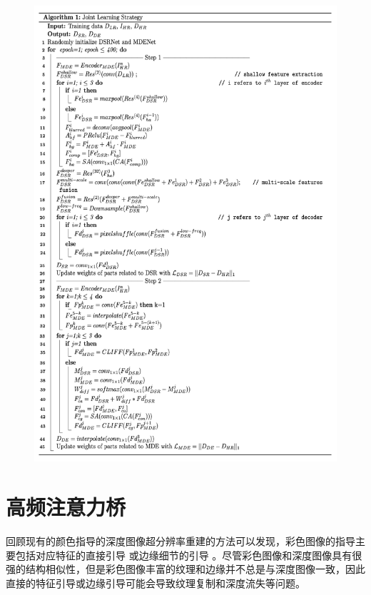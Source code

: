 \begin{figure}[!htbp]
	\centering
	\includegraphics{figures/21.png}
\end{figure}

\section{高频注意力桥}

回顾现有的颜色指导的深度图像超分辨率重建的方法可以发现，彩色图像的指导主要包括对应特征的直接引导 \cite{HuiLT16, LutioDWS19, DBLP:journals/tip/GuoLGCFH19} 或边缘细节的引导 \cite{DBLP:journals/tmm/WangXCZSY20, DBLP:conf/icassp/YeDL18}。尽管彩色图像和深度图像具有很强的结构相似性，但是彩色图像丰富的纹理和边缘并不总是与深度图像一致，因此直接的特征引导或边缘引导可能会导致纹理复制和深度流失等问题。

